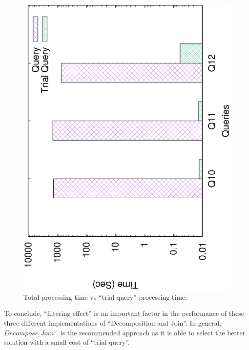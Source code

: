 \begin{figure}[H]
	\centering
	\includegraphics[scale=0.42, angle=270]{plot/threesample.eps}
	\caption{Total processing time vs ``trial query'' processing time.}
	\label{fig:threesample}
\end{figure}

To conclude, ``filtering effect'' is an important factor in the performance of these three different implementations of ``Decomposition and Join''. In general, $Decompose\_Join^{+}$ is the recommended approach as it is able to select the better solution with a small cost of ``trial query''.


%

